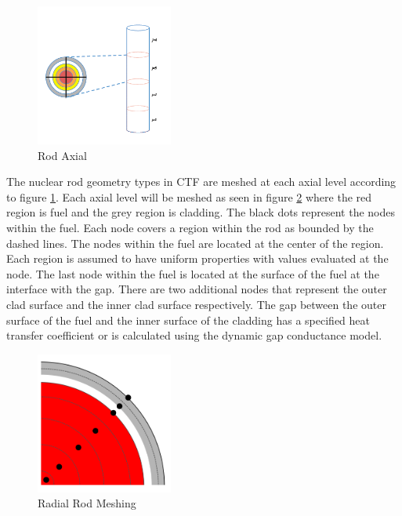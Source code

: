 \begin{figure}[!h]
	\centering
	\includegraphics[width=0.40\textwidth]{images/rod-axial.png}
	\caption{Rod Axial}
	\label{fig:rod-axial}
\end{figure}

The nuclear rod geometry types in CTF are meshed at each axial level according
to figure \ref{fig:rod-axial}. Each axial level will be meshed as seen in figure
\ref{fig:radial_diagram} where the red region is fuel and the grey region is
cladding. The black dots represent the nodes within the fuel. Each node covers
a region within the rod as bounded by the dashed lines. The nodes within the
fuel are located at the center of the region. Each region is assumed to have
uniform properties with values evaluated at the node. The last node within  the
fuel is located at the surface of the fuel at the interface with the gap. 
There are two additional nodes that represent the outer clad surface and the
inner  clad surface respectively. The gap between the outer surface of the fuel
and the inner surface of the cladding has a specified heat transfer coefficient
or is calculated using the dynamic gap conductance model.

	\begin{figure}[!h]
		\centering
		\includegraphics[width=0.40\textwidth]{images/radial_diagram.png}
		\caption{Radial Rod Meshing}
		\label{fig:radial_diagram}
	\end{figure}
	
